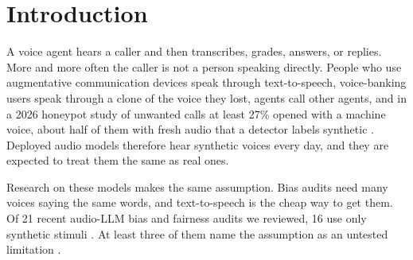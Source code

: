 \begin{abstract}
Most bias audits of audio language models use synthetic speech and assume a synthetic voice is treated like a real one. We test this with the speaker and the words held fixed. From 40 LibriSpeech readers we take 200 real utterances and make three matched versions of each: a zero-shot clone of the same speaker, a 6 kbps neural-codec re-encoding of the real recording, and a stock synthetic voice. Three models transcribe, grade, answer questions about, reply to, and judge the provenance of every clip. Gemini 3.6 Flash grades the clone within 0.005 points of the real recording on a 10-point scale (95\% interval $\pm0.16$, $n=200$), with equal word error rate and comprehension. Gemini 3.1 Pro ($+0.35$, interval $-0.90$ to $+1.46$, $n=60$) and Voxtral-Mini-3B ($-0.18$, interval $-0.40$ to $+0.05$, $n=40$) show no significant clone effect either. The codec re-encoding, however, costs 0.31 points on Flash ($p = 3.5\times10^{-4}$), the only effect of 49 that survives correction. Asked directly, the models cannot tell real from clone (balanced accuracy 0.555, 0.54, 0.50); the Gemini models call 74.5\% and 90\% of real recordings synthetic, and Voxtral calls every clip real. Earlier unmatched comparisons reported synthetic-versus-real gaps in both directions, some larger than 12 points; with speaker and words matched, the Gemini gap is zero. Synthetic stimuli are valid for auditing these models if both arms share the same compression.
\end{abstract}

\section{Introduction}
\label{sec:intro}

A voice agent hears a caller and then transcribes, grades, answers, or replies. More and more often the caller is not a person speaking directly. People who use augmentative communication devices speak through text-to-speech, voice-banking users speak through a clone of the voice they lost, agents call other agents, and in a 2026 honeypot study of unwanted calls at least 27\% opened with a machine voice, about half of them with fresh audio that a detector labels synthetic \citep{a2609_11137}. Deployed audio models therefore hear synthetic voices every day, and they are expected to treat them the same as real ones.

Research on these models makes the same assumption. Bias audits need many voices saying the same words, and text-to-speech is the cheap way to get them. Of 21 recent audio-LLM bias and fairness audits we reviewed, 16 use only synthetic stimuli \citep{a2510_02352,a2602_01030,a2511_06592,a2603_16941}. At least three of them name the assumption as an untested limitation \citep{a2509_22061,a2604_14548,a2602_04796}.

